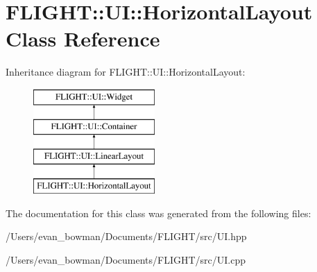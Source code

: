 \hypertarget{class_f_l_i_g_h_t_1_1_u_i_1_1_horizontal_layout}{}\section{F\+L\+I\+G\+HT\+:\+:UI\+:\+:Horizontal\+Layout Class Reference}
\label{class_f_l_i_g_h_t_1_1_u_i_1_1_horizontal_layout}
Inheritance diagram for F\+L\+I\+G\+HT\+:\+:UI\+:\+:Horizontal\+Layout\+:\begin{figure}[H]
\begin{center}
\leavevmode
\includegraphics[height=4.000000cm]{class_f_l_i_g_h_t_1_1_u_i_1_1_horizontal_layout}
\end{center}
\end{figure}


The documentation for this class was generated from the following files\+:\begin{DoxyCompactItemize}
\item 
/\+Users/evan\+\_\+bowman/\+Documents/\+F\+L\+I\+G\+H\+T/src/U\+I.\+hpp\item 
/\+Users/evan\+\_\+bowman/\+Documents/\+F\+L\+I\+G\+H\+T/src/U\+I.\+cpp\end{DoxyCompactItemize}
